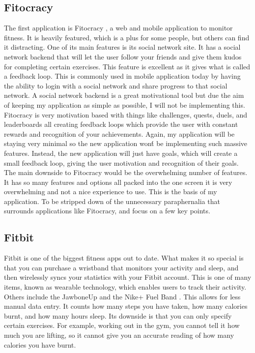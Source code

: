 \subsection{Fitocracy}
The first application is Fitocracy \citep{fitocracy:2007}, a web and mobile application to monitor fitness. It is heavily featured, which is a plus for some people, but others can find it distracting. One of its main features is its social network site. It has a social network backend that will let the user follow your friends and give them kudos for completing certain exercises. This feature is excellent as it gives what is called a feedback loop. This is commonly used in mobile application today by having the ability to login with a social network and share progress to that social network. A social network backend is a great motivational tool but due the aim of keeping my application as simple as possible, I will not be implementing this. Fitocracy is very motivation based with things like challenges, quests, duels, and leaderboards all creating feedback loops which provide the user with constant rewards and recognition of your achievements. Again, my application will be staying very minimal so the new application won\'t be implementing such massive features. Instead, the new application will just have goals, which will create a small feedback loop, giving the user motivation and recognition of their goals. The main downside to Fitocracy would be the overwhelming number of features. It has so many features and options all packed into the one screen it is very overwhelming and not a nice experience to use. This is the basis of my application. To be stripped down of the unnecessary paraphernalia that surrounds applications like Fitocracy, and focus on a few key points.


\subsection{Fitbit}
Fitbit is one of the biggest fitness apps out to date. What makes it so special is that you can purchase a wristband that monitors your activity and sleep, and then wirelessly syncs your statistics with your Fitbit account. This is one of many items, known as wearable technology, which enables users to track their activity. Others include the JawboneUp \citep{jawbone:2011} and the Nike+ Fuel Band \citep{nikefuelband:2012}. This allows for less manual data entry. It counts how many steps you have taken, how many calories burnt, and how many hours sleep. Its downside is that you can only specify certain exercises. For example, working out in the gym, you cannot tell it how much you are lifting, so it cannot give you an accurate reading of how many calories you have burnt.\\

